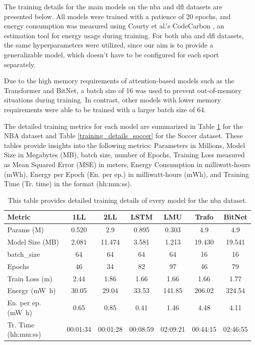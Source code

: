 The training details for the main models on the \gls{nba} and \gls{dfl} datasets are presented below. All models were trained with a patience of 20 epochs, and energy consumption was measured using Courty et al.'s CodeCarbon \cite{codecarbon}, an estimation tool for energy usage during training. For both \gls{nba} and \gls{dfl} datasets, the same hyperparameters were utilized, since our aim is to provide a generalizable model, which doesn't have to be configured for each sport separately.

Due to the high memory requirements of attention-based models such as the Transformer and BitNet, a batch size of 16 was used to prevent out-of-memory situations during training. In contrast, other models with lower memory requirements were able to be trained with a larger batch size of 64.

The detailed training metrics for each model are summarized in Table \ref{training_details_nba} for the NBA dataset and Table \ref{training_details_soccer} for the Soccer dataset. These tables provide insights into the following metrics: Parameters in Millions, Model Size in Megabytes (MB), batch size, number of Epochs, Training Loss measured as Mean Squared Error (MSE) in meters, Energy Consumption in milliwatt-hours ($\si{\milli\watt\hour}$), Energy per Epoch (En. per ep.) in milliwatt-hours ($\si{\milli\watt\hour}$), and Training Time (Tr. time) in the format (hh:mm:ss).




\begin{table}[b]
    \centering
    \caption[Table of Training details for NBA Dataset]{This table provides detailed training details of every model for the nba dataset.}
    \begin{tabular}{l||c|c|c|c|c|c}
        \label{training_details_nba}
        \textbf{Metric} & \textbf{1LL} & \textbf{2LL} & \textbf{LSTM} & \textbf{LMU} & \textbf{Trafo} & \textbf{BitNet} \\ \hline \hline
        Params (M) & 0.520 & 2.9 & 0.895 & 0.303 & 4.9 & 4.9 \\ \hline 
        Model Size (MB) & 2.081 & 11.474 & 3.581 & 1.213 & 19.430 & 19.541 \\ \hline 
        batch\_size & 64 & 64 & 64 & 64 & 16 & 16 \\ \hline 
        
        Epochs & 46 & 34 & 82 & 97 & 46 & 79 \\ \hline 
        Train Loss (\si{\meter})& 2.44 & 1.86 & 1.66 & 1.66 & 1.66 & 1.77 \\ \hline
        Energy (\si{\milli\watt\hour}) & 30.05 & 29.04 & 33.53 & 141.85 & 206.02 & 324.54 \\ \hline
        En. per ep. (\si{\milli\watt\hour}) & 0.65 & 0.85 & 0.41 & 1.46 & 4.48 & 4.11 \\ \hline
        Tr. Time (hh:mm:ss) & 00:01:34 & 00:01:28 & 00:08:59 & 02:09:21 & 00:44:15 & 02:46:55 \\ 
    \end{tabular}
\end{table}

